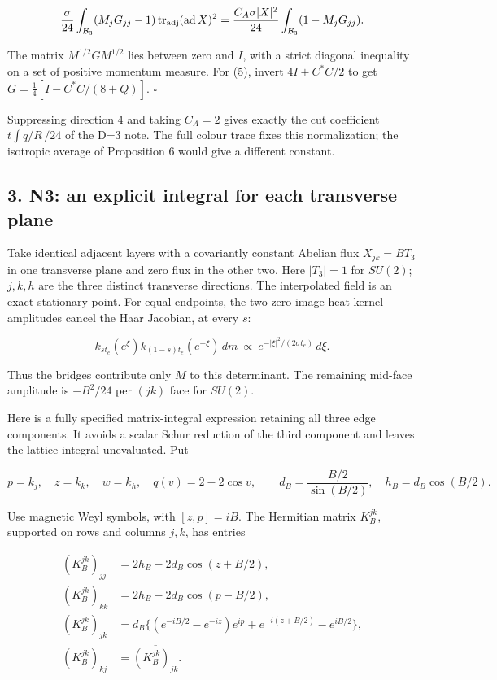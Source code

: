 \documentclass[11pt,a4paper]{article}
\begin{document}
\[\frac{\sigma}{24}\int_{\mathcal B_3}
 (M_jG_{jj}-1)\operatorname{tr}_{\rm adj}(\operatorname{ad}X)^2
 =\frac{C_A\sigma|X|^2}{24}\int_{\mathcal B_3}(1-M_jG_{jj}).\]

The matrix \(M^{1/2}GM^{1/2}\) lies between zero and \(I\), with a
strict diagonal inequality on a set of positive momentum measure. For
(5), invert \(4I+C^*C/2\) to get \(G=\frac14[I-C^*C/(8+Q)]\).
\(\square\)

Suppressing direction 4 and taking \(C_A=2\) gives exactly the cut
coefficient \(t\int q/R\,/24\) of the D=3 note. The full colour trace
fixes this normalization; the isotropic average of Proposition 6 would
give a different constant.

\hypertarget{n3-an-explicit-integral-for-each-transverse-plane}{%
\subsection{3. N3: an explicit integral for each transverse
plane}\label{n3-an-explicit-integral-for-each-transverse-plane}}

Take identical adjacent layers with a covariantly constant Abelian flux
\(X_{jk}=BT_3\) in one transverse plane and zero flux in the other two.
Here \(|T_3|=1\) for \(SU(2)\); \(j,k,h\) are the three distinct
transverse directions. The interpolated field is an exact stationary
point. For equal endpoints, the two zero-image heat-kernel amplitudes
cancel the Haar Jacobian, at every \(s\):

\[k_{st_e}(e^\xi)k_{(1-s)t_e}(e^{-\xi})\,dm
 \ \propto\ e^{-|\xi|^2/(2\sigma t_e)}\,d\xi.\]

Thus the bridges contribute only \(M\) to this determinant. The
remaining mid-face amplitude is \(-B^2/24\) per \((jk)\) face for
\(SU(2)\).

Here is a fully specified matrix-integral expression retaining all three
edge components. It avoids a scalar Schur reduction of the third
component and leaves the lattice integral unevaluated. Put

\[p=k_j,\quad z=k_k,\quad w=k_h,\quad q(v)=2-2\cos v,\qquad
 d_B=\frac{B/2}{\sin(B/2)},\quad h_B=d_B\cos(B/2).\]

Use magnetic Weyl symbols, with \([z,p]=iB\). The Hermitian matrix
\(K^{jk}_B\), supported on rows and columns \(j,k\), has entries

\[\begin{aligned}
 (K^{jk}_B)_{jj}&=2h_B-2d_B\cos(z+B/2),\\
 (K^{jk}_B)_{kk}&=2h_B-2d_B\cos(p-B/2),\\
 (K^{jk}_B)_{jk}&=d_B\{(e^{-iB/2}-e^{-iz})e^{ip}
                       +e^{-i(z+B/2)}-e^{iB/2}\},\\
 (K^{jk}_B)_{kj}&=\overline{(K^{jk}_B)_{jk}}.
\end{aligned}\tag{6}\]
\end{document}
